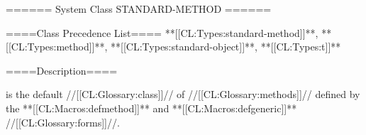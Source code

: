 ====== System Class STANDARD-METHOD ======

====Class Precedence List==== **[[CL:Types:standard-method]]**, **[[CL:Types:method]]**, **[[CL:Types:standard-object]]**, **[[CL:Types:t]]**

====Description====

 is the default //[[CL:Glossary:class]]// of //[[CL:Glossary:methods]]// defined by the **[[CL:Macros:defmethod]]** and **[[CL:Macros:defgeneric]]** //[[CL:Glossary:forms]]//.

  
